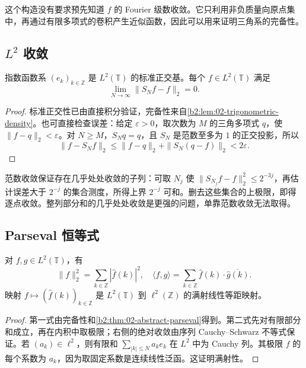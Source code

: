 这个构造没有要求预先知道 \(f\) 的 Fourier 级数收敛。它只利用非负质量向原点集中，再通过有限多项式的卷积产生近似函数，因此可以用来证明三角系的完备性。

\subsection{\texorpdfstring{\(L^2\)}{L²} 收敛}
\label{b2:subsec:020302}

\begin{theorem}\label{b2:thm:02-l2-convergence}
指数函数系 \((e_k)_{k\in\mathbb Z}\) 是 \(L^2(\mathbb T)\) 的标准正交基。每个 \(f\in L^2(\mathbb T)\) 满足
\[
 \lim_{N\to\infty}\|S_Nf-f\|_2=0.
\]
\end{theorem}
\begin{proof}
标准正交性已由直接积分验证，完备性来自\cref{b2:lem:02-trigonometric-density}。也可直接检查误差：给定 \(\varepsilon>0\)，取次数为 \(M\) 的三角多项式 \(q\)，使 \(\|f-q\|_2<\varepsilon\)。对 \(N\geq M\)，\(S_Nq=q\)，且 \(S_N\) 是范数至多为 \(1\) 的正交投影，所以
\[
 \|f-S_Nf\|_2\leq\|f-q\|_2+\|S_N(q-f)\|_2<2\varepsilon.
\]
\end{proof}

范数收敛保证存在几乎处处收敛的子列：可取 \(N_j\) 使 \(\|S_{N_j}f-f\|_2^2\leq2^{-3j}\)，再估计误差大于 \(2^{-j}\) 的集合测度，所得上界 \(2^{-j}\) 可和。删去这些集合的上极限，即得逐点收敛。整列部分和的几乎处处收敛是更强的问题，单靠范数收敛无法取得。

\subsection{Parseval 恒等式}
\label{b2:subsec:020303}

\begin{corollary}[Parseval]\label{b2:cor:02-parseval}
对 \(f,g\in L^2(\mathbb T)\)，有
\[
 \|f\|_2^2=\sum_{k\in\mathbb Z}|\widehat f(k)|^2,
 \quad
 \langle f,g\rangle=\sum_{k\in\mathbb Z}\widehat f(k)\cdot\overline{\widehat g(k)}.
\]
映射 \(f\mapsto(\widehat f(k))_{k\in\mathbb Z}\) 是 \(L^2(\mathbb T)\) 到 \(\ell^2(\mathbb Z)\) 的满射线性等距映射。
\end{corollary}
\begin{proof}
第一式由完备性和\cref{b2:thm:02-abstract-parseval}得到。第二式先对有限部分和成立，再在内积中取极限；右侧的绝对收敛由序列 Cauchy--Schwarz 不等式保证。若 \((a_k)\in\ell^2\)，则有限和 \(\sum_{|k|\leq N}a_ke_k\) 在 \(L^2\) 中为 Cauchy 列。其极限 \(f\) 的每个系数为 \(a_k\)，因为取固定系数是连续线性泛函。这证明满射性。
\end{proof}

